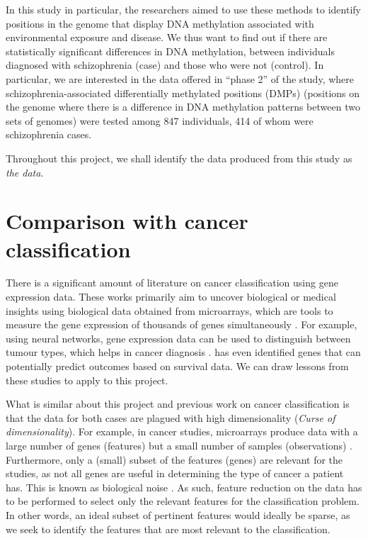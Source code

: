 \documentclass[12pt, twoside, a4paper]{report}
\begin{document}
In this study in particular, the researchers aimed to use these methods to identify positions in the genome that display DNA methylation associated with environmental exposure and disease. We thus want to find out if there are statistically significant differences in DNA methylation, between individuals diagnosed with schizophrenia (case) and those who were not (control). In particular, we are interested in the data offered in ``phase 2'' of the study, where schizophrenia-associated differentially methylated positions (DMPs) (positions on the genome where there is a difference in DNA methylation patterns between two sets of genomes) were tested among 847 individuals, 414 of whom were schizophrenia cases.

Throughout this project, we shall identify the data produced from this study as \textit{the data}.


\section{Comparison with cancer classification} \label{bg:cancer}

There is a significant amount of literature on cancer classification using gene expression data. These works primarily aim to uncover biological or medical insights using biological data obtained from microarrays, which are tools to measure the gene expression of thousands of genes simultaneously \citep{RefWorks:79}. For example, using neural networks, gene expression data can be used to distinguish between tumour types, which helps in cancer diagnosis \citep{RefWorks:80, RefWorks:88}. \cite{RefWorks:196} has even identified genes that can potentially predict outcomes based on survival data. We can draw lessons from these studies to apply to this project.

What is similar about this project and previous work on cancer classification is that the data for both cases are plagued with high dimensionality (\textit{Curse of dimensionality}). For example, in cancer studies, microarrays produce data with a large number of genes (features) but a small number of samples (observations) \cite{RefWorks:88}. Furthermore, only a (small) subset of the features (genes) are relevant for the studies, as not all genes are useful in determining the type of cancer a patient has. This is known as biological noise \cite{RefWorks:89}. As such, feature reduction on the data has to be performed to select only the relevant features for the classification problem. In other words, an ideal subset of pertinent features would ideally be sparse, as we seek to identify the features that are most relevant to the classification.
\end{document}
